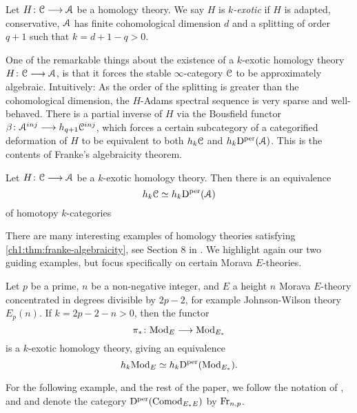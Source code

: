 \begin{definition}
    \label{ch1:def:k-exotic-homology-theory}
     Let $H\colon \EuScript{C}\longrightarrow \EuScript{A}$ be a homology theory. We say $H$ is \emph{$k$-exotic} if $H$ is adapted, conservative, $\EuScript{A}$ has finite cohomological dimension $d$ and a splitting of order $q+1$ such that $k=d+1-q>0$. 
\end{definition}
    
One of the remarkable things about the existence of a $k$-exotic homology theory $H\colon \EuScript{C}\longrightarrow \EuScript{A}$, is that it forces the stable $\infty$-category $\EuScript{C}$ to be approximately algebraic. Intuitively: As the order of the splitting is greater than the cohomological dimension, the $H$-Adams spectral sequence is very sparse and well-behaved. There is a partial inverse of $H$ via the Bousfield functor $\beta\colon \EuScript{A}^{inj}\longrightarrow h_{q+1} \EuScript{C}^{inj}$, which forces a certain subcategory of a categorified deformation of $H$ to be equivalent to both $h_k \EuScript{C}$ and $h_k \mathrm{D}^{\mathrm{per}}(\EuScript{A})$. This is the contents of Franke's algebraicity theorem. 
    
\begin{theorem}
    \label{ch1:thm:franke-algebraicity}
    Let $H\colon \EuScript{C}\longrightarrow \EuScript{A}$ be a $k$-exotic homology theory. Then there is an equivalence  
    \[h_k \EuScript{C} \simeq h_k \mathrm{D}^{\mathrm{per}}(\EuScript{A})\]
    of homotopy $k$-categories
\end{theorem}
    
There are many interesting examples of homology theories satisfying \cref{ch1:thm:franke-algebraicity}, see Section 8 in \cite{patchkoria-pstragowski_2021}. We highlight again our two guiding examples, but focus specifically on certain Morava $E$-theories. 

\begin{example}
    \label{ch1:ex:chromatic-algebraicity-modules}
    Let $p$ be a prime, $n$ be a non-negative integer, and $E$ a height $n$ Morava $E$-theory concentrated in degrees divisible by $2p-2$, for example Johnson-Wilson theory $E_p(n)$. If $k=2p-2-n>0$, then the functor 
    \[\pi_* \colon \mathrm{Mod}_{E} \longrightarrow \mathrm{Mod}_{E_*}\]
    is a $k$-exotic homology theory, giving an equivalence 
    \[h_k \mathrm{Mod}_{E} \simeq h_k \mathrm{D}^{\mathrm{per}}(\mathrm{Mod}_{E_*}).\]
\end{example}
    
\begin{notation}
    For the following example, and the rest of the paper, we follow the notation of \cite{barthel-schlank-stapleton_2020}, \cite{barthel-schlank-stapleton_2021} and \cite{barkan_2023} and denote the category $\mathrm{D}^{\mathrm{per}}(\mathrm{Comod}_{E_*E})$ by $\mathrm{Fr}_{n,p}$. 
\end{notation}
    
